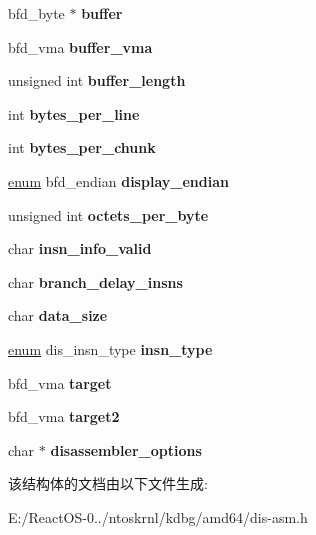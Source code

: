 \begin{DoxyCompactItemize}
bfd\+\_\+byte $\ast$ {\bfseries buffer}
\item 
\mbox{\label{structdisassemble__info_a71720c26d9d988ace6f41cd3aebac47f}} 
bfd\+\_\+vma {\bfseries buffer\+\_\+vma}
\item 
\mbox{\label{structdisassemble__info_a6df37a9d372ce0920e9f0241793a7d9b}} 
unsigned int {\bfseries buffer\+\_\+length}
\item 
\mbox{\label{structdisassemble__info_aaea78ecbdf1775e15a2ccec2c135a129}} 
int {\bfseries bytes\+\_\+per\+\_\+line}
\item 
\mbox{\label{structdisassemble__info_a616d39764ebe73ee1c72dd69ef10fc71}} 
int {\bfseries bytes\+\_\+per\+\_\+chunk}
\item 
\mbox{\label{structdisassemble__info_afa7a63cae7933d68f242f5a75edd14c7}} 
\hyperlink{interfaceenum}{enum} bfd\+\_\+endian {\bfseries display\+\_\+endian}
\item 
\mbox{\label{structdisassemble__info_ad31b39a7b46486b91ab44595c6d42fb4}} 
unsigned int {\bfseries octets\+\_\+per\+\_\+byte}
\item 
\mbox{\label{structdisassemble__info_a5b928900ca607cc6bb00eeb87974ff5e}} 
char {\bfseries insn\+\_\+info\+\_\+valid}
\item 
\mbox{\label{structdisassemble__info_ae43975d08e7c5155a08fa32e734a11a1}} 
char {\bfseries branch\+\_\+delay\+\_\+insns}
\item 
\mbox{\label{structdisassemble__info_ac3a1e6bdf92baba6fc0cffcb45b8ab18}} 
char {\bfseries data\+\_\+size}
\item 
\mbox{\label{structdisassemble__info_ae947469e79751374be00881d2b71aa5a}} 
\hyperlink{interfaceenum}{enum} dis\+\_\+insn\+\_\+type {\bfseries insn\+\_\+type}
\item 
\mbox{\label{structdisassemble__info_a1fa5f3758f999a4667f3982ff2074b5f}} 
bfd\+\_\+vma {\bfseries target}
\item 
\mbox{\label{structdisassemble__info_a07edb54a6bdc88ed3753493ba4e4a7f3}} 
bfd\+\_\+vma {\bfseries target2}
\item 
\mbox{\label{structdisassemble__info_a7f192d6e64d5cba2786bda6f006e1e79}} 
char $\ast$ {\bfseries disassembler\+\_\+options}
\end{DoxyCompactItemize}


该结构体的文档由以下文件生成\+:\begin{DoxyCompactItemize}
\item 
E\+:/\+React\+O\+S-\/0../ntoskrnl/kdbg/amd64/dis-\/asm.\+h\end{DoxyCompactItemize}
